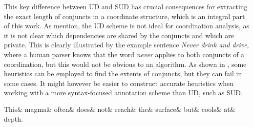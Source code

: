 \begin{exe}
    \ex
    \label{ex:distribution Mary}
    \begin{xlist}
    \end{xlist}
\end{exe}

This key difference between UD and SUD has crucial consequences for extracting the exact length of conjuncts in a coordinate structure, which is an integral part of this work. As \cite{prz:woz:23} mention, the UD scheme is not ideal for coordination analysis, as it is not clear which dependencies are shared by the conjuncts and which are private. This is clearly illustrated by the example sentence \textsl{Never drink and drive}, where a human parser knows that the word \textsl{never} applies to both conjuncts of a coordination, but this would not be obvious to an algorithm. As shown in \cite{pbg2023}, some heuristics can be employed to find the extents of conjuncts, but they can fail in some cases. It might however be easier to construct accurate heuristics when working with a more syntax-focused annotation scheme than UD, such as SUD. 


\begin{exe}
	\ex
	\label{ex:UD magma}
	
	\begin{dependency}[hide label, baseline=-\the\dimexpr\fontdimen22\textfont2\relax]
	\begin{deptext}
	This\& magma\& often\& does\& not\& reach\& the\& surface\& but\& cools\& at\& depth.\\
	\end{deptext}
	\end{dependency}
\end{exe}

